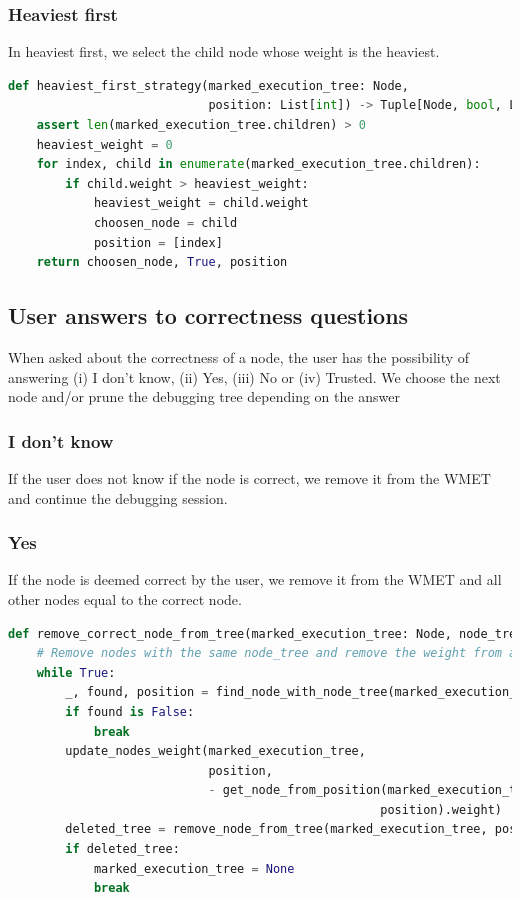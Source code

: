 \subsubsection{Heaviest first}
In heaviest first, we select the child node whose weight is the heaviest.
\begin{lstlisting}[language=Python, caption=Heaviest first strategy implementation]
def heaviest_first_strategy(marked_execution_tree: Node,
                            position: List[int]) -> Tuple[Node, bool, List[int]]:
    assert len(marked_execution_tree.children) > 0
    heaviest_weight = 0
    for index, child in enumerate(marked_execution_tree.children):
        if child.weight > heaviest_weight:
            heaviest_weight = child.weight
            choosen_node = child
            position = [index]
    return choosen_node, True, position
\end{lstlisting}
\subsection{User answers to correctness questions}
\label{implementation:correctnessAnswers}
When asked about the correctness of a node, the user has the possibility of answering (i) I don't know, (ii) Yes, (iii) No or (iv) Trusted.
We choose the next node and/or prune the debugging tree depending on the answer
\subsubsection{I don't know}
If the user does not know if the node is correct, we remove it from the WMET and continue the debugging session.
\subsubsection{Yes}
If the node is deemed correct by the user, we remove it from the WMET and all other nodes equal to the correct node.
\begin{lstlisting}[language=Python, caption=Correct node action]
def remove_correct_node_from_tree(marked_execution_tree: Node, node_tree: Node):
    # Remove nodes with the same node_tree and remove the weight from all its parents
    while True:
        _, found, position = find_node_with_node_tree(marked_execution_tree, [], node_tree)
        if found is False:
            break
        update_nodes_weight(marked_execution_tree,
                            position,
                            - get_node_from_position(marked_execution_tree,
                                                    position).weight)
        deleted_tree = remove_node_from_tree(marked_execution_tree, position)
        if deleted_tree:
            marked_execution_tree = None
            break
\end{lstlisting}

